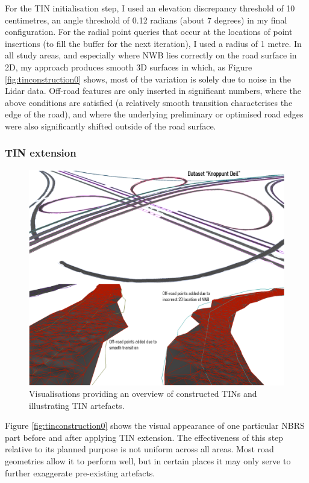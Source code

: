 For the TIN initialisation step, I used an elevation discrepancy threshold of 10 centimetres, an angle threshold of 0.12 radians (about 7 degrees) in my final configuration. For the radial point queries that occur at the locations of point insertions (to fill the buffer for the next iteration), I used a radius of 1 metre. In all study areas, and especially where NWB lies correctly on the road surface in 2D, my approach produces smooth 3D surfaces in which, as Figure \ref{fig:tinconstruction0} shows, most of the variation is solely due to noise in the Lidar data. Off-road features are only inserted in significant numbers, where the above conditions are satisfied (a relatively smooth transition characterises the edge of the road), and where the underlying preliminary or optimised road edges were also significantly shifted outside of the road surface.

\subsubsection{TIN extension}

\begin{figure}
    \centering
    \includegraphics[width=0.9\linewidth]{final_report/figs/tinconstruction1.png}
    \caption{Visualisations providing an overview of constructed TINs and illustrating TIN artefacts.}
    \label{fig:tinconstruction1}
\end{figure}

Figure \ref{fig:tinconstruction0} shows the visual appearance of one particular NBRS part before and after applying TIN extension. The effectiveness of this step relative to its planned purpose is not uniform across all areas. Most road geometries allow it to perform well, but in certain places it may only serve to further exaggerate pre-existing artefacts.

